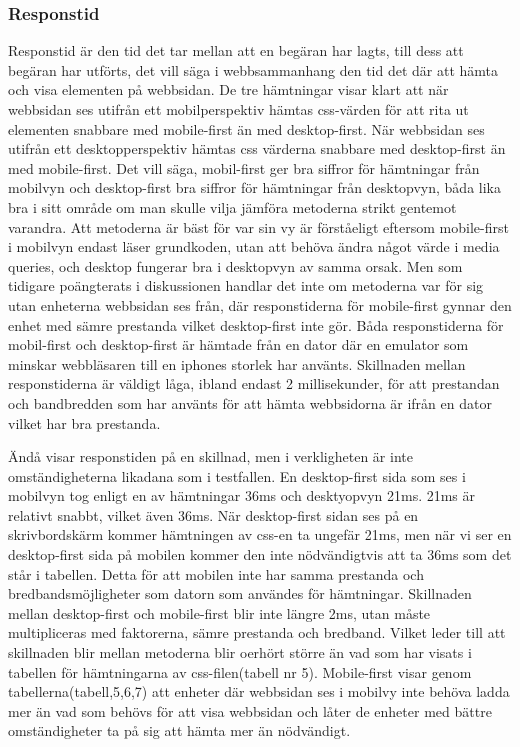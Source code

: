 \documentclass[11pt]{article}
\begin{document}
\subsubsection{Responstid}
Responstid är den tid det tar mellan att en begäran har lagts, till dess att begäran har utförts, det vill säga i webbsammanhang den tid det där att hämta och visa elementen på webbsidan. De tre hämtningar visar klart att när webbsidan ses utifrån ett mobilperspektiv hämtas css-värden för att rita ut elementen snabbare med mobile-first än med desktop-first. När webbsidan ses utifrån ett desktopperspektiv hämtas css värderna snabbare med desktop-first än med mobile-first. Det vill säga, mobil-first ger bra siffror för hämtningar från mobilvyn och desktop-first bra siffror för hämtningar från desktopvyn, båda lika bra i sitt område om man skulle vilja jämföra metoderna strikt gentemot varandra. Att metoderna är bäst för var sin vy är förståeligt eftersom mobile-first i mobilvyn endast läser grundkoden, utan att behöva ändra något värde i media queries, och desktop fungerar bra i desktopvyn av samma orsak. Men som tidigare poängterats i diskussionen handlar det inte om metoderna var för sig utan enheterna webbsidan ses från, där responstiderna för mobile-first gynnar den enhet med sämre prestanda vilket desktop-first inte gör. Båda responstiderna för mobil-first och desktop-first är hämtade från en dator där en emulator som minskar webbläsaren till en iphones storlek har använts. Skillnaden mellan responstiderna är väldigt låga, ibland endast 2 millisekunder, för att prestandan och bandbredden som har använts för att hämta webbsidorna är ifrån en dator vilket har bra prestanda. 

Ändå visar responstiden på en skillnad, men i verkligheten är inte omständigheterna likadana som i testfallen. En desktop-first sida som ses i mobilvyn tog enligt en av hämtningar 36ms och desktyopvyn 21ms. 21ms är relativt snabbt, vilket även 36ms. När desktop-first sidan ses på en skrivbordskärm kommer hämtningen av css-en ta ungefär 21ms, men när vi ser en desktop-first sida på mobilen kommer den inte nödvändigtvis att ta 36ms som det står i tabellen. Detta för att mobilen inte har samma prestanda och bredbandsmöjligheter som datorn som användes för hämtningar. Skillnaden mellan desktop-first och mobile-first blir inte längre 2ms, utan måste multipliceras med faktorerna, sämre prestanda och bredband. Vilket leder till att skillnaden blir mellan metoderna blir oerhört större än vad som har visats i tabellen för hämtningarna av css-filen(tabell nr 5). Mobile-first visar genom tabellerna(tabell,5,6,7) att enheter där webbsidan ses i mobilvy inte behöva ladda mer än vad som behövs för att visa webbsidan och låter de enheter med bättre omständigheter ta på sig att hämta mer än nödvändigt.
\end{document}
